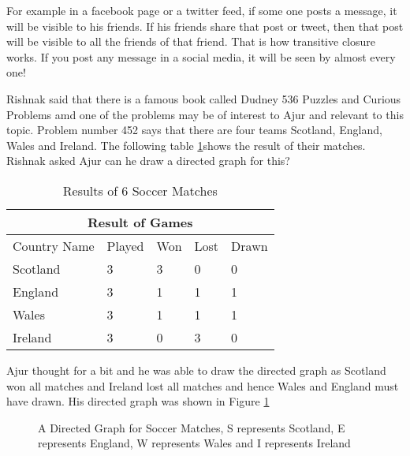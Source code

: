 For example in a facebook page or a twitter feed, if some one posts a message, it will be visible to his friends. If his friends share that post or tweet, then that post will be visible to all the friends of that friend. That is how transitive closure works. If you post any message in a social media, it will be seen
by almost every one!


Rishnak said that there is a famous book called Dudney 536 Puzzles and Curious Problems amd one of the problems may be of interest to Ajur and relevant to this topic. Problem number 452 says that there are four teams Scotland, England, Wales and Ireland. The following table \ref {14t1}shows the result of their matches. Rishnak asked Ajur can he draw a directed graph for this? 
\begin{table}
\begin{center}
\begin{tabular}{ |p{3cm}||p{1.5cm}||p{1.5cm}||p{1.5cm}||p{1.5cm}||  }
 \hline
 \multicolumn{5}{|c|}{Result of Games} \\
 \hline
 Country Name & Played &Won&Lost&Drawn\\
 \hline
 Scotland  & 3    &3&0&0\\
 England& 3& 1 &1&1\\
 Wales&3 &1&1&1\\
 Ireland    &3 &0&3&0\\
 
 \hline
\end{tabular}
\caption{Results of 6 Soccer Matches}\label{14t1}
\end{center}
\end{table}

Ajur thought for a bit and he was able to draw the directed graph as Scotland won all matches and Ireland lost all matches and hence Wales and England must have drawn. His directed graph was shown in Figure \ref{15g33}

\begin{figure}
\begin{center}
\caption{ A Directed Graph for Soccer Matches, S represents Scotland, E represents England, W represents Wales and I represents Ireland}\label{15g33}
\end{center}
\end{figure}

